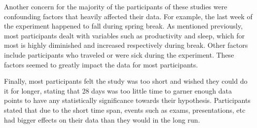 Another concern for the majority of the participants of these studies were confounding factors that heavily affected their data. For example, the last week of the experiment happened to fall during spring break. As mentioned previously, most participants dealt with variables such as productivity and sleep, which for most is highly diminished and increased respectively during break. Other factors include participants who traveled or were sick during the experiment. These factors seemed to greatly impact the data for most participants.

Finally, most participants felt the study was too short and wished they could do it for longer, stating that 28 days was too little time to garner enough data points to have any statistically significance towards their hypothesis. Participants stated that due to the short time span, events such as exams, presentations, etc had bigger effects on their data than they would in the long run. 
